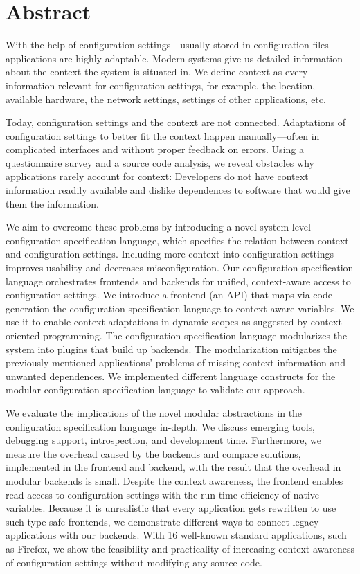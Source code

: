 \chapter{Abstract}

With the help of configuration settings---usually stored in configuration files---applications are highly adaptable.
Modern systems give us detailed information about the context the system is situated in.
We define context as every information relevant for configuration settings, for example, the location, available hardware, the network settings, settings of other applications, etc.

Today, configuration settings and the context are not connected.
Adaptations of configuration settings to better fit the context happen manually---often in complicated interfaces and without proper feedback on errors.
Using a questionnaire survey and a source code analysis, we reveal obstacles why applications rarely account for context:
Developers do not have context information readily available and dislike dependences to software that would give them the information.

We aim to overcome these problems by introducing a novel system-level configuration specification language, which specifies the relation between context and configuration settings.
Including more context into configuration settings improves usability and decreases misconfiguration.
Our configuration specification language orchestrates frontends and backends for unified, context-aware access to configuration settings.
We introduce a frontend (an API) that maps via code generation the configuration specification language to context-aware variables.
We use it to enable context adaptations in dynamic scopes as suggested by context-oriented programming.
The configuration specification language modularizes the system into plugins that build up backends.
The modularization mitigates the previously mentioned applications' problems of missing context information and unwanted dependences.
We implemented different language constructs for the modular configuration specification language to validate our approach.

We evaluate the implications of the novel modular abstractions in the configuration specification language in-depth.
We discuss emerging tools, debugging support, introspection, and development time.
Furthermore, we measure the overhead caused by the backends and compare solutions, implemented in the frontend and backend, with the result that the overhead in modular backends is small.
Despite the context awareness, the frontend enables read access to configuration settings with the run-time efficiency of native variables.
Because it is unrealistic that every application gets rewritten to use such type-safe frontends, we demonstrate different ways to connect legacy applications with our backends.
With 16 well-known standard applications, such as Firefox, we show the feasibility and practicality of increasing context awareness of configuration settings without modifying any source code.
